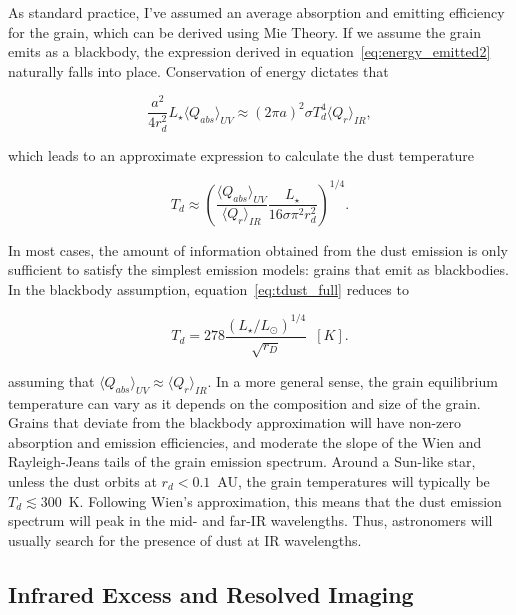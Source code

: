     
    \noindent As standard practice, I've assumed an average absorption and emitting efficiency for the grain, which can be derived using Mie Theory. If we assume the grain emits as a blackbody, the expression derived in equation~\ref{eq:energy_emitted2} naturally falls into place. Conservation of energy dictates that
            
            
    \begin{equation}\label{eq:conserve_energy} 
     \frac{a^2}{4r_d^2}L_\star \langle Q_{abs}\rangle_{UV} \approx \left(2\pi a\right)^2 \sigma T_d^4 \langle Q_{r}\rangle_{IR},
    \end{equation}
            
    \noindent which leads to an approximate expression to calculate the dust temperature
    
    \begin{equation}\label{eq:tdust_full}
    T_d \approx \left(\frac{\langle Q_{abs} \rangle_{UV}}{\langle Q_{r}\rangle_{IR}} \frac{L_\star}{16\sigma \pi^2 r_d^2}\right)^{1/4}.
    \end{equation}
        
    In most cases, the amount of information obtained from the dust emission is only sufficient to satisfy the simplest emission models: grains that emit as blackbodies. In the blackbody assumption, equation~\ref{eq:tdust_full} reduces to 
            
    \begin{equation}\label{eq:blackbody_temp}
            T_d = 278 \frac{\left(L_\star/L_\odot \right)^{1/4}}{\sqrt{r_D}}\enspace [K]. 
    \end{equation}
    
    \noindent assuming that $\langle Q_{abs} \rangle_{UV} \approx \langle Q_{r}\rangle_{IR}$. In a more general sense, the grain equilibrium temperature can vary as it depends on the composition and size of the grain\citep{Draine2003}. Grains that deviate from the blackbody approximation will have non-zero absorption and emission efficiencies, and moderate the slope of the Wien and Rayleigh-Jeans tails of the grain emission spectrum. Around a Sun-like star, unless the dust orbits at $r_d<0.1$~AU, the grain temperatures will typically be $T_d \lesssim 300$~K. Following Wien's approximation, this means that the dust emission spectrum will peak in the mid- and far-IR wavelengths. Thus, astronomers will usually search for the presence of dust at IR wavelengths. 

    \subsection{Infrared Excess and Resolved Imaging}\label{sec:excess_resolvedimaging}


